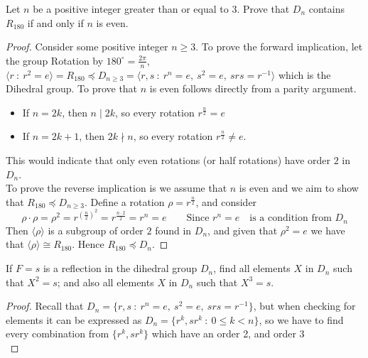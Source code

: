 \begin{assignment}[
  header=HeaderA,
  body=BodyA,
  title={Homework 2},
  duedate={17-February-2026},
  toc=false,
  toctitle={This appears on the Table of contents.},
  exlist=false
]

\begin{exer}[Problem 1.23]
Let $n$ be a positive integer greater than or equal to $3$. Prove that $D_n$ contains $R_{180}$ if and only if $n$ is even.
\begin{proof}
Consider some positive integer $n \geq 3$. To prove the forward implication,
let the group Rotation by $180^{\circ} = \frac{2\pi}{n}$, $\langle r \ : \ r^2 = e\rangle = R_{180}  \preccurlyeq D_{n\geq 3} =\langle r,s \ : \ r^n = e,\ s^2 = e,\ srs = r^{-1} \rangle$ which is the Dihedral group. To prove that $n$ is even follows directly from a parity argument. 
\begin{itemize}
    \item If $n = 2k$, then $n \mid 2k$, so every rotation $r^{\frac{n}{2}} = e$   
    \item If $n = 2k +1$, then $2k \nmid n$, so every rotation $r^{\frac{n}{2}} \neq e$. 
\end{itemize}
This would indicate that only even rotations (or half rotations) have order $2$ in $D_n$.\\

To prove the reverse implication is we assume that $n$ is even and we aim to show that $R_{180} \preccurlyeq D_{n\geq 3}$. Define a rotation $\rho = r^{\frac{n}{2}}$, and consider 
\[
\rho \cdot \rho = \rho^2 = r^{(\frac{n}{2})^2} = r^{\frac{n\cdot 2}{2}} = r^{n} = e \quad \quad \text{Since } r^n = e \quad \text{is a condition from } D_n
\]
Then $\langle \rho \rangle$ is a subgroup of order $2$ found in $D_n$, and given that $\rho^2 = e$ we have that $\langle \rho \rangle \cong R_{180}$. Hence  $R_{180} \preccurlyeq D_n$.
\end{proof}
\end{exer}

\begin{exer}[Problem 1.24]
If $F = s$ is a reflection in the dihedral group $D_n$, find all elements $X$ in $D_n$ such that $X^2 = s$; and also all elements $X$ in $D_n$ such that $X^3 = s$.
\begin{proof}
Recall that $D_n = \{r,s \ : \ r^n = e,\ s^2 =e,\ srs = r^{-1}\}$, but when checking for elements it can be expressed as $D_n = \{r^k, sr^k \ : \ 0 \leq k < n \}$, so we have to find every combination from $\{r^k, sr^k\}$ which have an order 2, and order 3\\


\end{proof}
\end{exer}
\end{assignment}
